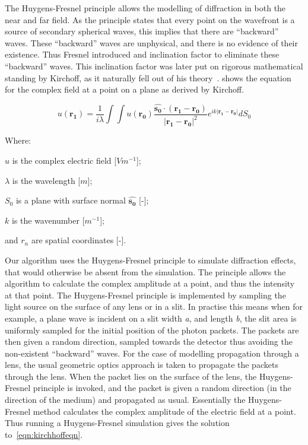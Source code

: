 The Huygens-Fresnel principle allows the modelling of diffraction in both the near and far field.
As the principle states that every point on the wavefront is a source of secondary spherical waves, this implies that there are ``backward'' waves.
These ``backward'' waves are unphysical, and there is no evidence of their existence.
Thus Fresnel introduced and inclination factor to eliminate these ``backward'' waves.
This inclination factor was later put on rigorous mathematical standing by Kirchoff, as it naturally fell out of his theory~\cite{kirchhoff1883ann,born2000principles}.
 shows the equation for the complex field at a point on a plane as derived by Kirchoff.

\begin{equation}
u(\mathbf{r_1})=\frac{1}{i\lambda}\int\int u(\mathbf{r_0})\frac{\mathbf{\hat{s_0}} \cdot (\mathbf{r_1} - \mathbf{r_0})}{\left|\mathbf{r_1} - \mathbf{r_0}\right|^2}e^{ik\left|\mathbf{r_1} - \mathbf{r_0}\right|}dS_0
\label{eqn:kirchhoffeqn}
\end{equation}

\noindent Where:

    \indent $u$ is the complex electric field [$Vm^{-1}$];

    \indent $\lambda$ is the wavelength [$m$];

    \indent $S_0$ is a plane with surface normal $\mathbf{\hat{s_0}}$ [-];

    \indent $k$ is the wavenumber [$m^{-1}$];

    \indent and $r_n$ are spatial coordinates [-]. 

\medskip

Our algorithm uses the Huygens-Fresnel principle to simulate diffraction effects, that would otherwise be absent from the simulation.
The principle allows the algorithm to calculate the complex amplitude at a point, and thus the intensity at that point.
The Huygens-Fresnel principle is implemented by sampling the light source on the surface of any lens or in a slit.
In practise this means when for example, a plane wave is incident on a slit width \textit{a}, and length \textit{b}, the slit area is uniformly sampled for the initial position of the photon packets.
The packets are then given a random direction, sampled towards the detector thus avoiding the non-existent ``backward'' waves.
For the case of modelling propagation through a lens, the usual geometric optics approach is taken to propagate the packets through the lens.
When the packet lies on the surface of the lens, the Huygens-Fresnel principle is invoked, and the packet is given a random direction (in the direction of the medium) and propagated as usual.
Essentially the Huygens-Fresnel method calculates the complex amplitude of the electric field at a point.
Thus running a Huygens-Fresnel simulation gives the solution to~\cref{eqn:kirchhoffeqn}.

